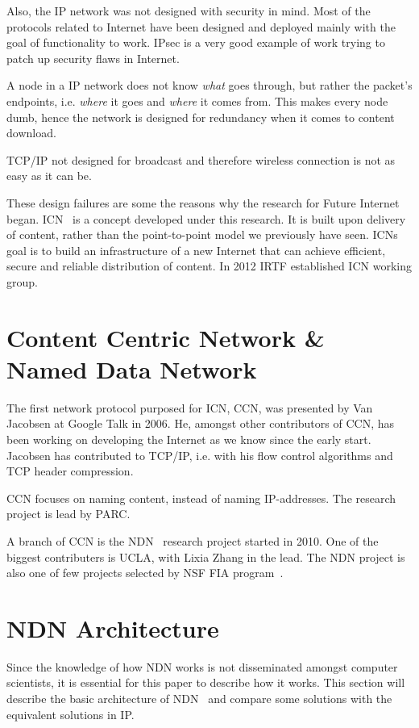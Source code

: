 Also, the \gls{IP} network was not designed with security in mind. 
Most of the protocols related to Internet have been designed and deployed mainly with the goal of functionality to work.
\gls{IPsec} is a very good example of work trying to patch up security flaws in Internet.

A node in a \gls{IP} network does not know \textit{what} goes through, but rather the packet's endpoints, i.e. \textit{where} it goes and \textit{where} it comes from. 
This makes every node dumb, hence the network is designed for redundancy when it comes to content download.

\gls{TCP}/\gls{IP} not designed for broadcast and therefore wireless connection is not as easy as it can be.

These design failures are some the reasons why the research for Future Internet began.  
\gls{ICN}~\cite{DBLP:journals/cm/AhlgrenDIKO12} is a concept developed under this research.
It is built upon delivery of content, rather than the point-to-point model we previously have seen.
\gls{ICN}s goal is to build an infrastructure of a new Internet that can achieve efficient, secure and reliable distribution of content.
In 2012 \gls{IRTF} established \gls{ICN} working group.


\section{Content Centric Network \& Named Data Network}\label{chp2:sec:icn}
The first network protocol purposed for \gls{ICN}, \gls{CCN}, was presented by Van Jacobsen at Google Talk in 2006. 
He, amongst other contributors of \gls{CCN}, has been working on developing the Internet as we know since the early start.
Jacobsen has contributed to \gls{TCP}/\gls{IP}, i.e. with his flow control algorithms and \gls{TCP} header compression. 

\gls{CCN} focuses on naming content, instead of naming \gls{IP}-addresses. 
The research project is lead by \gls{PARC}.

A branch of \gls{CCN} is the \gls{NDN}~\cite{DBLP:journals/ccr/0001ABJcCPWZ14} research project started in 2010.
One of the biggest contributers is \gls{UCLA}, with Lixia Zhang in the lead. 
The \gls{NDN} project is also one of few projects selected by \gls{NSF} \gls{FIA} program~\cite{nsf-fia}.

\section{NDN Architecture}\label{chp2:sec:ndn_architecture}
Since the knowledge of how \gls{NDN} works is not disseminated amongst computer scientists, it is essential for this paper to describe how it works.
This section will describe the basic architecture of \gls{NDN}~\cite{NDN-0021} and compare some solutions with the equivalent solutions in \gls{IP}.

